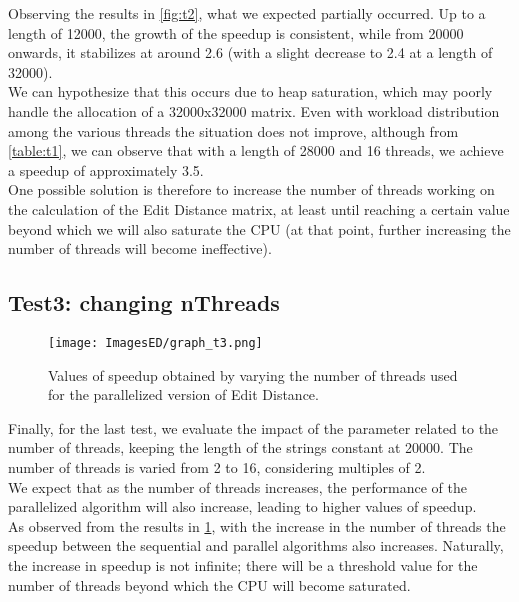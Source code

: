 \documentclass[10pt,twocolumn,letterpaper]{article}
\begin{document}
Observing the results in \cref{fig:t2}, what we expected partially occurred. Up to a length of 12000, the growth of the speedup is consistent, while from 20000 onwards, it stabilizes at around 2.6 (with a slight decrease to 2.4 at a length of 32000).\\
We can hypothesize that this occurs due to heap saturation, which may poorly handle the allocation of a 32000x32000 matrix. Even with workload distribution among the various threads the situation does not improve, although from \cref{table:t1}, we can observe that with a length of 28000 and 16 threads, we achieve a speedup of approximately 3.5.\\
One possible solution is therefore to increase the number of threads working on the calculation of the Edit Distance matrix, at least until reaching a certain value beyond which we will also saturate the CPU (at that point, further increasing the number of threads will become ineffective).

\subsection{Test3: changing nThreads}

\begin{figure}[h]
    \centering
    \texttt{[image: ImagesED/graph\_t3.png]}
    \caption{Values of speedup obtained by varying the number of threads used for the parallelized version of Edit Distance.}
    \label{fig:t3}
\end{figure}

Finally, for the last test, we evaluate the impact of the parameter related to the number of threads, keeping the length of the strings constant at 20000. The number of threads is varied from 2 to 16, considering multiples of 2.\\
We expect that as the number of threads increases, the performance of the parallelized algorithm will also increase, leading to higher values of speedup.\\
As observed from the results in \cref{fig:t3}, with the increase in the number of threads the speedup between the sequential and parallel algorithms also increases. Naturally, the increase in speedup is not infinite; there will be a threshold value for the number of threads beyond which the CPU will become saturated.
\end{document}

